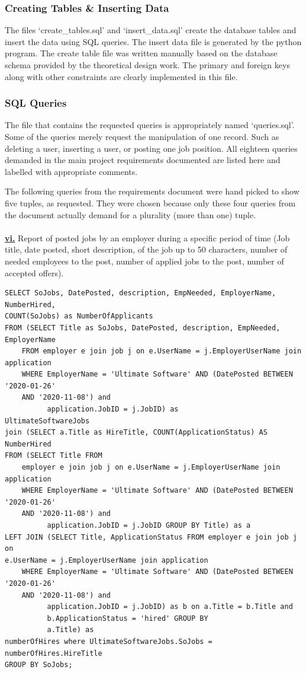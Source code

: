\documentclass[11pt]{article}
\begin{document}
\subsubsection{Creating Tables \& Inserting Data}
The files `create\_tables.sql' and `insert\_data.sql' create the database tables and insert the data using SQL queries. The insert data file is generated by the python program. The create table file was written manually based on the database schema provided by the theoretical design work. The primary and foreign keys along with other constraints are clearly implemented in this file.


\subsubsection{SQL Queries}

The file that contains the requested queries is appropriately named `queries.sql'. Some of the queries merely request the manipulation of one record. Such as deleting a user, inserting a user, or posting one job position. All eighteen queries demanded in the main project requirements documented are listed here and labelled with appropriate comments. \par 
The following queries from the requirements document were hand picked to show five tuples, as requested. They were chosen because only these four queries from the document actually demand for a plurality (more than one) tuple. \\
\\
\underline{\textbf{vi.}} Report of posted jobs by an employer during a specific period of time (Job title, date posted, short description, of the job up to 50 characters, number of needed employees to the post, number of applied jobs to the post, number of accepted offers). \\

\begin{verbatim}
SELECT SoJobs, DatePosted, description, EmpNeeded, EmployerName, NumberHired, 
COUNT(SoJobs) as NumberOfApplicants
FROM (SELECT Title as SoJobs, DatePosted, description, EmpNeeded, EmployerName
    FROM employer e join job j on e.UserName = j.EmployerUserName join application
    WHERE EmployerName = 'Ultimate Software' AND (DatePosted BETWEEN '2020-01-26' 
    AND '2020-11-08') and
          application.JobID = j.JobID) as
UltimateSoftwareJobs
join (SELECT a.Title as HireTitle, COUNT(ApplicationStatus) AS NumberHired
FROM (SELECT Title FROM
    employer e join job j on e.UserName = j.EmployerUserName join application
    WHERE EmployerName = 'Ultimate Software' AND (DatePosted BETWEEN '2020-01-26' 
    AND '2020-11-08') and
          application.JobID = j.JobID GROUP BY Title) as a
LEFT JOIN (SELECT Title, ApplicationStatus FROM employer e join job j on 
e.UserName = j.EmployerUserName join application
    WHERE EmployerName = 'Ultimate Software' AND (DatePosted BETWEEN '2020-01-26'
    AND '2020-11-08') and
          application.JobID = j.JobID) as b on a.Title = b.Title and 
          b.ApplicationStatus = 'hired' GROUP BY
          a.Title) as
numberOfHires where UltimateSoftwareJobs.SoJobs = numberOfHires.HireTitle
GROUP BY SoJobs;
\end{verbatim}
\end{document}
